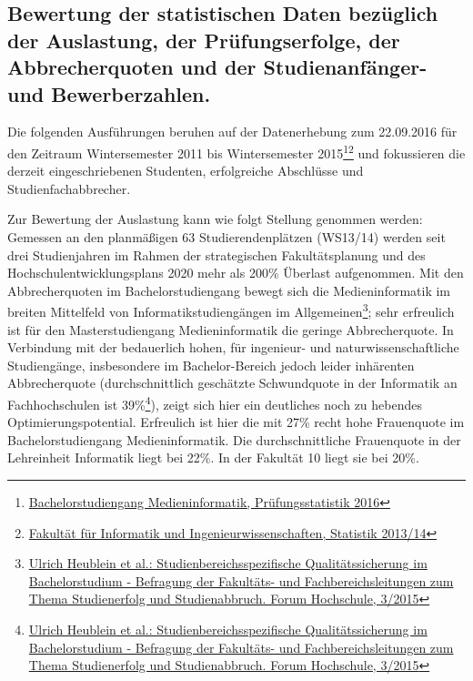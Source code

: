 \subsection{Bewertung der statistischen Daten bezüglich der
Auslastung, der Prüfungserfolge, der Abbrecherquoten und der
Studienanfänger- und
Bewerberzahlen.}\label{bewertung-der-statistischen-daten-bezuxfcglich-der-auslastung-der-pruxfcfungserfolge-der-abbrecherquoten-und-der-studienanfuxe4nger--und-bewerberzahlen.}

Die folgenden Ausführungen beruhen auf der Datenerhebung zum 22.09.2016
für den Zeitraum Wintersemester 2011 bis Wintersemester 2015\footnote{\href{https://th-koeln.github.io/mi-2017/anhaenge/ba-pruefungsstatistiken.pdf}{Bachelorstudiengang
  Medieninformatik, Prüfungsstatistik 2016}}\footnote{\href{https://th-koeln.github.io/mi-2017/anhaenge/fak-Fakultaetsstruktur-Studienangebot-Personal-Haushaltsmittel-Kennzahlen-2014.pdf}{Fakultät
  für Informatik und Ingenieurwissenschaften, Statistik 2013/14}} und
fokussieren die derzeit eingeschriebenen Studenten, erfolgreiche
Abschlüsse und Studienfachabbrecher.

Zur Bewertung der Auslastung kann wie folgt Stellung genommen werden:
Gemessen an den planmäßigen 63 Studierendenplätzen (WS13/14) werden seit
drei Studienjahren im Rahmen der strategischen Fakultätsplanung und des
Hochschulentwicklungsplans 2020 mehr als 200\% Überlast aufgenommen. Mit
den Abbrecherquoten im Bachelorstudiengang bewegt sich die
Medieninformatik im breiten Mittelfeld von Informatikstudiengängen im
Allgemeinen\footnote{\href{http://www.dzhw.eu/pdf/pub_fh/fh-201503.pdf}{Ulrich
  Heublein et al.: Studienbereichsspezifische Qualitätssicherung im
  Bachelorstudium - Befragung der Fakultäts- und Fachbereichsleitungen
  zum Thema Studienerfolg und Studienabbruch. Forum Hochschule, 3/2015}};
sehr erfreulich ist für den Masterstudiengang Medieninformatik die
geringe Abbrecherquote. In Verbindung mit der bedauerlich hohen, für
ingenieur- und naturwissenschaftliche Studiengänge, insbesondere im
Bachelor-Bereich jedoch leider inhärenten Abbrecherquote
(durchschnittlich geschätzte Schwundquote in der Informatik an
Fachhochschulen ist 39\%\footnote{\href{http://www.dzhw.eu/pdf/pub_fh/fh-201503.pdf}{Ulrich
  Heublein et al.: Studienbereichsspezifische Qualitätssicherung im
  Bachelorstudium - Befragung der Fakultäts- und Fachbereichsleitungen
  zum Thema Studienerfolg und Studienabbruch. Forum Hochschule, 3/2015}}),
zeigt sich hier ein deutliches noch zu hebendes Optimierungspotential.
Erfreulich ist hier die mit 27\% recht hohe Frauenquote im
Bachelorstudiengang Medieninformatik. Die durchschnittliche Frauenquote
in der Lehreinheit Informatik liegt bei 22\%. In der Fakultät 10 liegt
sie bei 20\%.

